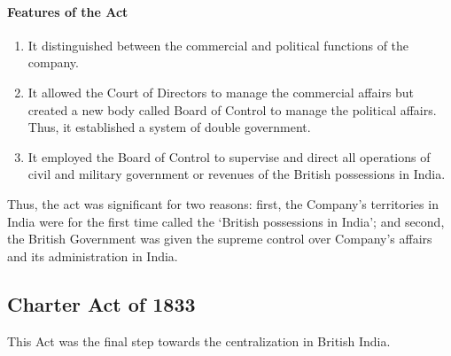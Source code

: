 \begin{multicol}{2}
\paragraph{Features of the Act}
\begin{enumerate}
  \item It distinguished between the commercial and political functions of the company.
  \item It allowed the Court of Directors to manage the commercial affairs but created a new body called Board of Control to manage the political affairs. Thus, it established a system of double government.
  \item It employed the Board of Control to supervise and direct all operations of civil and military government or revenues of the British possessions in India.
\end{enumerate}

Thus, the act was significant for two reasons: first, the Company's territories in India were for the first time called the `British possessions in India'; and second, the British Government was given the supreme control over Company's affairs and its administration in India.

\subsection{Charter Act of 1833}

This Act was the final step towards the centralization in British India.


\end{multicol}
